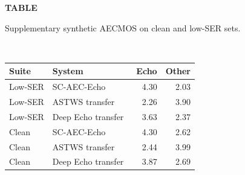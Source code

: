 \par\noindent
{}
\label{tab:synthetic-aecmos}
\begin{center}
\textbf{TABLE \thetable}\\
\parbox{0.96\linewidth}{\centering Supplementary synthetic AECMOS on clean and low-SER sets.}\\[0.5ex]
\begin{tabular}{llrr}
\hline
Suite & System & Echo & Other \\
\hline
Low-SER & SC-AEC-Echo & 4.30 & 2.03 \\
Low-SER & ASTWS transfer~\cite{zhao2024astws} & 2.26 & 3.90 \\
Low-SER & Deep Echo transfer~\cite{zhao2024deepecho} & 3.63 & 2.37 \\
Clean & SC-AEC-Echo & 4.30 & 2.62 \\
Clean & ASTWS transfer~\cite{zhao2024astws} & 2.44 & 3.99 \\
Clean & Deep Echo transfer~\cite{zhao2024deepecho} & 3.87 & 2.69 \\
\hline
\end{tabular}
\end{center}
\par\medskip

